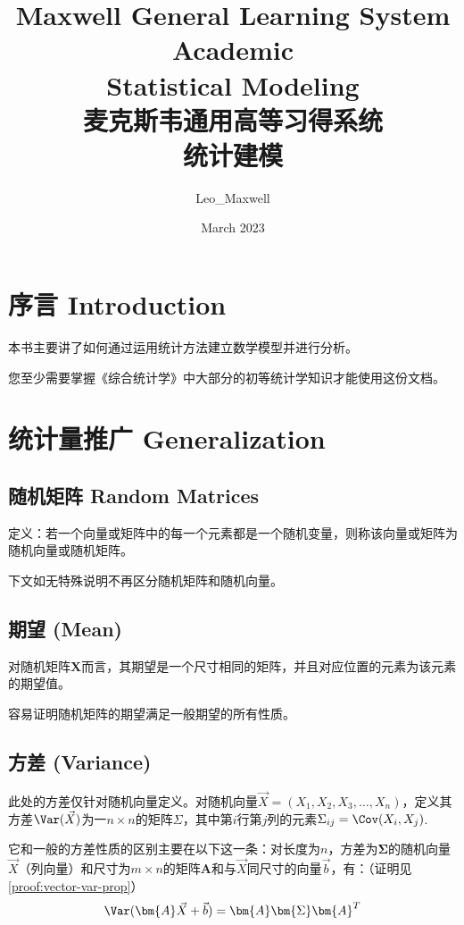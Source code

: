 \documentclass{MGLSA-cn-book-math}
\title{Maxwell General Learning System Academic\\ Statistical Modeling\\ 麦克斯韦通用高等习得系统\\ 统计建模}
\author{Leo\_Maxwell }
\date{March 2023}
\begin{document}
\maketitle

\tableofcontents
\newpage

\chapter*{序言 Introduction}
本书主要讲了如何通过运用统计方法建立数学模型并进行分析。

您至少需要掌握《综合统计学》中大部分的初等统计学知识才能使用这份文档。


\chapter{统计量推广 Generalization}
\section{随机矩阵 Random Matrices}

定义：若一个向量或矩阵中的每一个元素都是一个随机变量，则称该向量或矩阵为随机向量或随机矩阵。

下文如无特殊说明不再区分随机矩阵和随机向量。
\section{期望 (Mean)}
对随机矩阵$\bm{X}$而言，其期望是一个尺寸相同的矩阵，并且对应位置的元素为该元素的期望值。

容易证明随机矩阵的期望满足一般期望的所有性质。
\section{方差 (Variance)}
此处的方差仅针对随机向量定义。对随机向量$\vec{X}=(X_1,X_2,X_3,\dots,X_n)$，定义其方差$\Var (\vec{X})$为一$n\times n$的矩阵$\Sigma$，其中第$i$行第$j$列的元素$\Sigma_{ij}=\Cov (X_i,X_j)$.

它和一般的方差性质的区别主要在以下这一条：对长度为$n$，方差为$\bm{\Sigma}$的随机向量$\vec{X}$（列向量）和尺寸为$m\times n$的矩阵$\bm{A}$和与$\vec{X}$同尺寸的向量$\vec{b}$，有：（证明见\ref{proof:vector-var-prop}）
\[
	\Var (\bm{A}\vec{X}+\vec{b})=\bm{A}\bm{\Sigma}\bm{A}^T
\]
\end{document}
